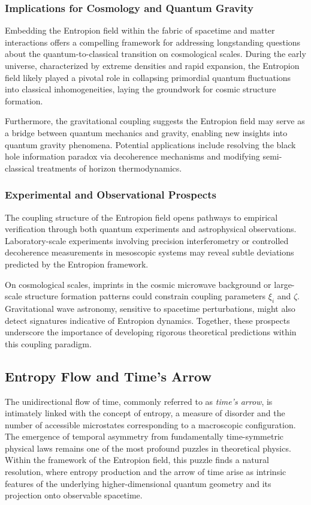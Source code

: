 \documentclass[12pt]{article}
\begin{document}
\subsubsection*{Implications for Cosmology and Quantum Gravity}

Embedding the Entropion field within the fabric of spacetime and matter interactions offers a compelling framework for addressing longstanding questions about the quantum-to-classical transition on cosmological scales. During the early universe, characterized by extreme densities and rapid expansion, the Entropion field likely played a pivotal role in collapsing primordial quantum fluctuations into classical inhomogeneities, laying the groundwork for cosmic structure formation.

Furthermore, the gravitational coupling suggests the Entropion field may serve as a bridge between quantum mechanics and gravity, enabling new insights into quantum gravity phenomena. Potential applications include resolving the black hole information paradox via decoherence mechanisms and modifying semi-classical treatments of horizon thermodynamics.

\subsubsection*{Experimental and Observational Prospects}

The coupling structure of the Entropion field opens pathways to empirical verification through both quantum experiments and astrophysical observations. Laboratory-scale experiments involving precision interferometry or controlled decoherence measurements in mesoscopic systems may reveal subtle deviations predicted by the Entropion framework.

On cosmological scales, imprints in the cosmic microwave background or large-scale structure formation patterns could constrain coupling parameters $\xi_i$ and $\zeta$. Gravitational wave astronomy, sensitive to spacetime perturbations, might also detect signatures indicative of Entropion dynamics. Together, these prospects underscore the importance of developing rigorous theoretical predictions within this coupling paradigm.

\subsection{Entropy Flow and Time’s Arrow}

The unidirectional flow of time, commonly referred to as \emph{time’s arrow}, is intimately linked with the concept of entropy, a measure of disorder and the number of accessible microstates corresponding to a macroscopic configuration. The emergence of temporal asymmetry from fundamentally time-symmetric physical laws remains one of the most profound puzzles in theoretical physics. Within the framework of the Entropion field, this puzzle finds a natural resolution, where entropy production and the arrow of time arise as intrinsic features of the underlying higher-dimensional quantum geometry and its projection onto observable spacetime.
\end{document}

